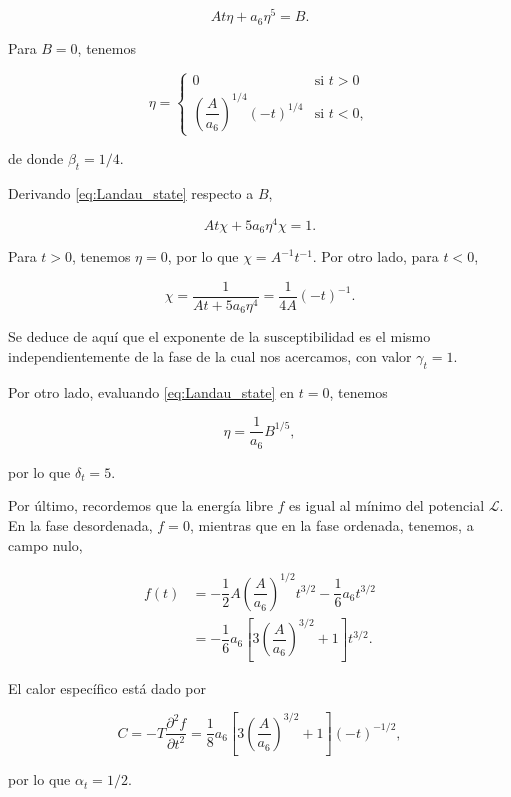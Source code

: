 \documentclass[10pt]{article}
\begin{document}
\begin{equation}\label{eq:Landau_state}
At\eta + a_6\eta^5 = B.
\end{equation}

Para $B=0$, tenemos

\[ \eta = \begin{cases} 
      0 & \text{si } t>	 0 \\
      \left(\dfrac{A}{a_6}\right)^{1/4} (-t)^{1/4} &\text{si } t< 0,
   \end{cases}
\]

de donde $\beta_t = 1/4$.

Derivando \ref{eq:Landau_state} respecto a $B$,

\begin{equation}
A t \chi + 5 a_6 \eta^4 \chi = 1.
\end{equation}

Para $t>0$, tenemos $\eta = 0$, por lo que $\chi = A^{-1} t^{-1}$. Por otro lado, para $t<0$,

\begin{equation}
\chi = \dfrac{1}{At + 5a_6\eta^4} = \dfrac{1}{4A} (-t)^{-1}.
\end{equation}

Se deduce de aqu\'i que el exponente de la susceptibilidad es el mismo independientemente de la fase de la cual nos acercamos, con valor $\gamma_t = 1$.

Por otro lado, evaluando \ref{eq:Landau_state} en $t = 0$, tenemos

\begin{equation}
\eta = \dfrac{1}{a_6} B^{1/5},
\end{equation}

por lo que $\delta_t = 5$.

Por \'ultimo, recordemos que la energ\'ia libre $f$ es igual al m\'inimo del potencial $\mathcal{L}$. En la fase desordenada, $f = 0$, mientras que en la fase ordenada, tenemos, a campo nulo,

\begin{align}
f(t) &= -\dfrac{1}{2} A \left( \dfrac{A}{a_6}\right)^{1/2} t^{3/2} - \dfrac{1}{6} a_6 t^{3/2}\\
&= -\dfrac{1}{6}a_6\left[3 \left( \dfrac{A}{a_6}\right)^{3/2} + 1\right] t^{3/2}.
\end{align}

El calor espec\'ifico est\'a dado por

\begin{equation}
C = -T \dfrac{\partial^2 f}{\partial t^2} = \dfrac{1}{8} a_6\left[3 \left( \dfrac{A}{a_6}\right)^{3/2} + 1\right] (-t)^{-1/2},
\end{equation}

por lo que $\alpha_t = 1/2$.
\end{document}
